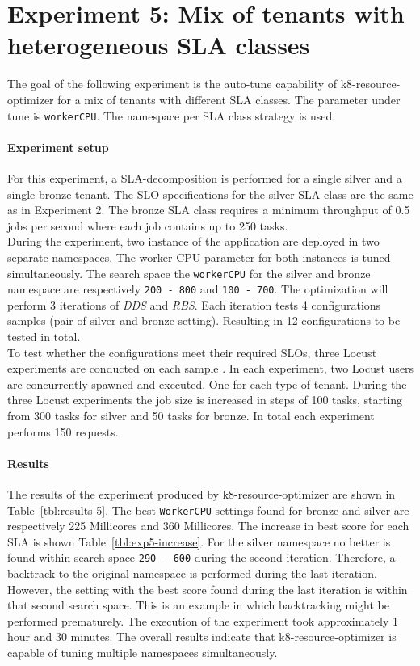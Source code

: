 \section{Experiment 5:  Mix of tenants with heterogeneous SLA classes}
The goal of the following experiment is the auto-tune capability of k8-resource-optimizer for a mix of tenants with different SLA classes. The parameter under tune is \texttt{workerCPU}. The namespace per SLA class strategy is used.
\paragraph{Experiment setup}
For this experiment, a SLA-decomposition is performed for a single silver and a single bronze tenant. The SLO specifications for the silver SLA class are the same as in Experiment 2. The bronze SLA class requires a minimum throughput of 0.5 jobs per second where each job contains up to 250 tasks. \\
During the experiment, two instance of the application are deployed in two separate namespaces. The worker CPU parameter for both instances is tuned simultaneously. The search space the \texttt{workerCPU} for the silver and bronze namespace are respectively \texttt{200 - 800} and \texttt{100 - 700}. The optimization will perform 3 iterations of \textit{DDS} and \textit{RBS}. Each iteration tests 4 configurations samples (pair of silver and bronze setting). Resulting in  12 configurations to be tested in total.\\
To test whether the configurations meet their required SLOs, three Locust experiments are conducted on each sample . In each experiment, two Locust users are concurrently spawned and executed. One for each type of tenant. During the three Locust experiments the job size is increased in steps of 100 tasks, starting from 300 tasks for silver and 50 tasks for bronze. In total each experiment performs 150 requests. 

\paragraph{Results}
The results of the experiment produced by k8-resource-optimizer are shown in Table~\ref{tbl:results-5}. The best \texttt{WorkerCPU} settings found for bronze and silver are respectively 225 Millicores and 360 Millicores. The increase in best score for each SLA is shown Table~\ref{tbl:exp5-increase}. For the silver namespace no better is found within search space \texttt{290 - 600} during the second iteration. Therefore, a backtrack to the original namespace is performed during the last iteration. However, the setting with the best score found during the last iteration is within that second search space. This is an example in which backtracking might be performed prematurely. The execution of the experiment took approximately 1 hour and 30 minutes.  The overall results indicate that k8-resource-optimizer is capable of tuning multiple namespaces simultaneously.



